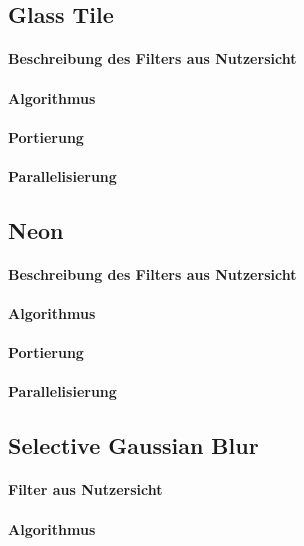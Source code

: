 \documentclass[10pt,a4paper,draft]{article}
\begin{document}
\subsection{Glass Tile}
\paragraph{Beschreibung des Filters aus Nutzersicht}
\paragraph{Algorithmus} 
\paragraph{Portierung}
\paragraph{Parallelisierung}



\subsection{Neon}
\paragraph{Beschreibung des Filters aus Nutzersicht}
\paragraph{Algorithmus} 
\paragraph{Portierung}
\paragraph{Parallelisierung}



\subsection{Selective Gaussian Blur}
\paragraph{Filter aus Nutzersicht}
\paragraph{Algorithmus} 
\end{document}
